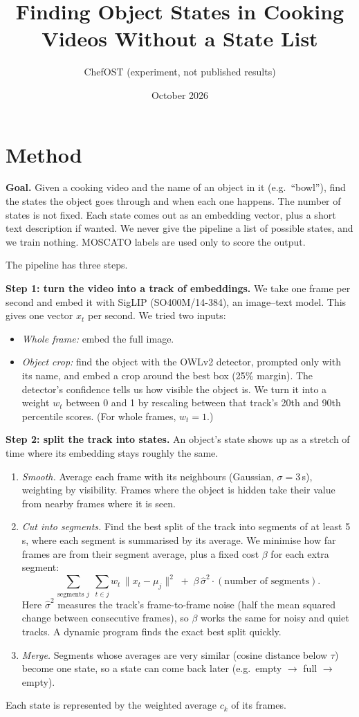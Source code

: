 \documentclass[10pt]{article}
\title{Finding Object States in Cooking Videos Without a State List}
\author{ChefOST (experiment, not published results)}
\date{October 2026}
\begin{document}
\maketitle

\section{Method}
\textbf{Goal.} Given a cooking video and the name of an object in it (e.g.\ ``bowl''), find the states the
object goes through and when each one happens. The number of states is not fixed. Each state comes out as an
embedding vector, plus a short text description if wanted. We never give the pipeline a list of possible
states, and we train nothing. MOSCATO labels are used only to score the output.

The pipeline has three steps.

\textbf{Step 1: turn the video into a track of embeddings.} We take one frame per second and embed it with
SigLIP (SO400M/14-384), an image--text model. This gives one vector $x_t$ per second. We tried two inputs:
\begin{itemize}
\item \emph{Whole frame:} embed the full image.
\item \emph{Object crop:} find the object with the OWLv2 detector, prompted only with its name, and embed a
crop around the best box (25\% margin). The detector's confidence tells us how visible the object is. We turn
it into a weight $w_t$ between 0 and 1 by rescaling between that track's 20th and 90th percentile scores.
(For whole frames, $w_t=1$.)
\end{itemize}

\textbf{Step 2: split the track into states.} An object's state shows up as a stretch of time where its
embedding stays roughly the same.
\begin{enumerate}
\item \emph{Smooth.} Average each frame with its neighbours (Gaussian, $\sigma=3$\,s), weighting by
visibility. Frames where the object is hidden take their value from nearby frames where it is seen.
\item \emph{Cut into segments.} Find the best split of the track into segments of at least 5\,s, where each
segment is summarised by its average. We minimise how far frames are from their segment average, plus a
fixed cost $\beta$ for each extra segment:
\[ \textstyle\sum_{\text{segments } j}\;\sum_{t\in j} w_t\,\|x_t-\mu_j\|^2 \;+\; \beta\,\hat\sigma^2 \cdot (\text{number of segments}). \]
Here $\hat\sigma^2$ measures the track's frame-to-frame noise (half the mean squared change between
consecutive frames), so $\beta$ works the same for noisy and quiet tracks. A dynamic program finds the exact
best split quickly.
\item \emph{Merge.} Segments whose averages are very similar (cosine distance below $\tau$) become one state,
so a state can come back later (e.g.\ empty $\to$ full $\to$ empty).
\end{enumerate}
Each state is represented by the weighted average $c_k$ of its frames.
\end{document}
